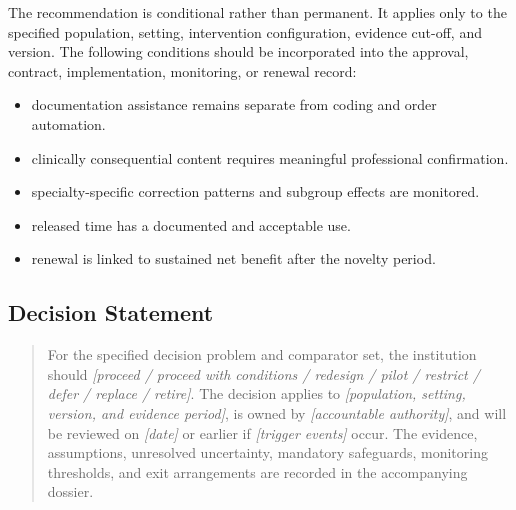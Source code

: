 The recommendation is conditional rather than permanent. It applies only to the
specified population, setting, intervention configuration, evidence cut-off, and
version. The following conditions should be incorporated into the approval,
contract, implementation, monitoring, or renewal record:

\begin{itemize}
 \item documentation assistance remains separate from coding and order automation.
 \item clinically consequential content requires meaningful professional confirmation.
 \item specialty-specific correction patterns and subgroup effects are monitored.
 \item released time has a documented and acceptable use.
 \item renewal is linked to sustained net benefit after the novelty period.
\end{itemize}

\subsection{Decision Statement}
\begin{quote}
For the specified decision problem and comparator set, the institution should
\emph{[proceed / proceed with conditions / redesign / pilot / restrict / defer /
replace / retire]}. The decision applies to \emph{[population, setting, version,
and evidence period]}, is owned by \emph{[accountable authority]}, and will be
reviewed on \emph{[date]} or earlier if \emph{[trigger events]} occur. The
evidence, assumptions, unresolved uncertainty, mandatory safeguards, monitoring
thresholds, and exit arrangements are recorded in the accompanying dossier.
\end{quote}
